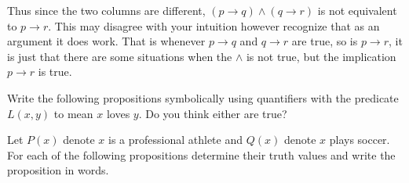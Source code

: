 \documentclass[addpoints, answers]{exam}
\begin{document}
\begin{questions}
\begin{parts}
\begin{solution}
      Thus since the two columns are different, $(p\rightarrow q) \wedge 
      (q\rightarrow r)$ is not equivalent to $p\rightarrow r$. This may disagree
      with your intuition however recognize that as an argument it does work.
      That is whenever $p\rightarrow q$ and $q\rightarrow r$ are true, so is
      $p\rightarrow r$, it is just that there are some situations when the
      $\wedge$ is not true, but the implication $p\rightarrow r$ is true. 
    \end{solution}

  \end{parts}

  \question[6] Write the following propositions symbolically using quantifiers
  with the predicate $L(x,y)$ to mean $x$ loves $y$. Do you think either are
  true?
  
  \question[6] Let $P(x)$ denote $x$ is a professional athlete and $Q(x)$ denote
  $x$ plays soccer. For each of the following propositions determine their truth
  values and write the proposition in words.
\end{questions}
\end{document}

